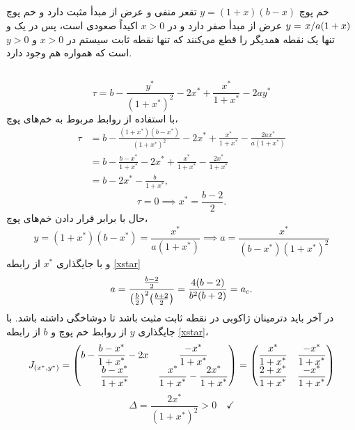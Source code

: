 \documentclass[12pt,a4paper]{article}
\newcommand{\ddfrac}[2]{{\displaystyle\frac{\displaystyle #1}{\displaystyle #2}}}
\begin{document}
	\subsection{}
	خم پوچ $y=(1+x)(b-x)$ تقعر منفی و عرض از مبدأ مثبت دارد و خم پوچ $y=\flatfrac{x}{a(1+x)}$
	عرض از مبدأ صفر دارد و در $x>0 $ اکیداً صعودی است، پس در یک و تنها یک نقطه همدیگر را قطع می‌کنند که تنها نقطه
	ثابت سیستم در $x>0 $ و $y>0 $ است که همواره هم وجود دارد.
	\subsection{}
	\begin{equation}
		\tau = b - \frac{y^*}{(1 + x^*)^2} - 2x^* + \frac{x^*}{1 + x^*} - 2ay^*
	\end{equation}
	با استفاده از روابط مربوط به خم‌های پوچ،
	\begin{align}
		\tau &= b - \frac{(1 + x^*)(b - x^*)}{(1 + x^*)^2} - 2x^* + \frac{x^*}{1 + x^*} - \frac{2ax^*}{a(1 + x^*)} \\
		&= b - \frac{b-x^*}{1 + x^*} - 2x^* + \frac{x^*}{1+x^*} - \frac{2x^*}{1 + x^*} \\
		&= b - 2x^* - \frac{b}{1+x^*},
	\end{align}
	\begin{equation}\label{xstar}
		\tau=0 \implies x^* = \frac{b-2}{2}.
	\end{equation}
	حال با برابر قرار دادن خم‌های پوچ،
	\begin{equation}
		y = (1+x^*)(b-x^*) = \frac{x^*}{a(1+x^*)} \implies a = \frac{x^*}{(b-x^*)(1+x^*)^2}
	\end{equation}
	و با جایگذاری $x^*$ از رابطه \eqref{xstar}
	\begin{equation}
		a = \frac{\frac{b-2}{2}}{\qty(\frac{b}{2})^2\qty(\frac{b+2}{2})} = \frac{4(b-2)}{b^2(b+2)} = a_c.
	\end{equation}
	در آخر باید دترمینان ژاکوبی در نقطه ثابت مثبت باشد تا دوشاخگی  داشته باشد.
	با جایگذاری $y$ از روابط خم پوچ و $b$ از رابطه \eqref{xstar}،
	\begin{equation}
		J_{(x^*,y^*)} = \mqty(b-\ddfrac{b-x^*}{1+x^*}-2x & \ddfrac{-x^*}{1+x^*}
			\\ \ddfrac{b-x^*}{1+x^*} & \ddfrac{x^*}{1+x^*} - \ddfrac{2x^*}{1+x^*})
		= \mqty(\ddfrac{x^*}{1+x^*} & \ddfrac{-x^*}{1+x^*}
			\\ \ddfrac{2+x^*}{1+x^*} & \ddfrac{-x^*}{1+x^*})
	\end{equation}
	\begin{equation}
		\Delta = \frac{2x^*}{(1+x^*)^2} > 0 \quad \checkmark
	\end{equation}
\end{document}
